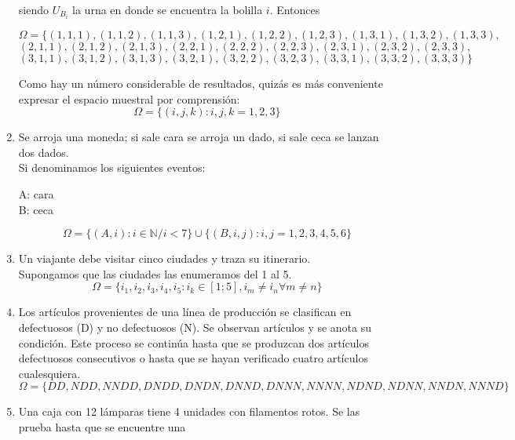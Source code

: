 \begin{enumerate}
            siendo $U_{B_i}$ la urna en donde se encuentra la bolilla $i$. Entonces
            \begin{center}
                $\Omega=\{(1,1,1),(1,1,2),(1,1,3),(1,2,1),(1,2,2),(1,2,3),(1,3,1),(1,3,2),(1,3,3),$\\
                $(2,1,1),(2,1,2),(2,1,3),(2,2,1),(2,2,2),(2,2,3),(2,3,1),(2,3,2),(2,3,3),$\\
                $(3,1,1),(3,1,2),(3,1,3),(3,2,1),(3,2,2),(3,2,3),(3,3,1),(3,3,2),(3,3,3)\}$
            \end{center}
            Como hay un número considerable de resultados, quizás es más conveniente expresar el espacio muestral por comprensión:
            \[\Omega=\{(i,j,k):i,j,k=1,2,3\}\]
        \item Se arroja una moneda; si sale cara se arroja un dado, si sale ceca se lanzan dos dados.\e\\
            Si denominamos los siguientes eventos:
            \begin{center}
                A: cara\\
                B: ceca
            \end{center}
            \[\Omega=\{(A,i):i\in\mathbb{N}/i<7\}\cup\{(B,i,j):i,j=1,2,3,4,5,6\}\]
        \item Un viajante debe visitar cinco ciudades y traza su itinerario.\e\\
            Supongamos que las ciudades las enumeramos del 1 al 5.\[\Omega=\{i_1,i_2,i_3,i_4,i_5:i_k\in[1;5],i_m\neq i_n\forall m\neq n\}\]
        \item Los artículos provenientes de una línea de producción se clasifican en defectuosos (D) y no defectuosos (N). Se observan artículos y se anota su condición. Este proceso se continúa hasta que se produzcan dos artículos defectuosos consecutivos o hasta que se hayan verificado cuatro artículos cualesquiera.
            \[\Omega=\{DD,NDD,NNDD,DNDD,DNDN,DNND,DNNN,NNNN,NDND,NDNN,NNDN,NNND\}\]
        \item Una caja con 12 lámparas tiene 4 unidades con filamentos rotos. Se las prueba hasta que se encuentre una

\end{enumerate}
